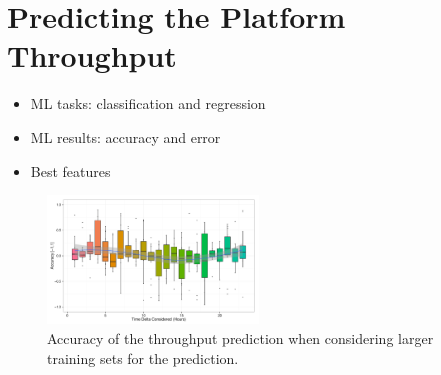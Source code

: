 \section{Predicting the Platform Throughput}\label{sec:throughput}
\begin{itemize}

	\item ML tasks: classification and regression

	\item ML results: accuracy and error

	\item Best features

\end{itemize}







\begin{figure}[htbp]
	\centering
		\includegraphics[width=0.5\textwidth]{figures/ML_accuracy}
	\caption{Accuracy of the throughput prediction when considering larger training sets for the prediction.}
	\label{fig:accuracy}
\end{figure}

